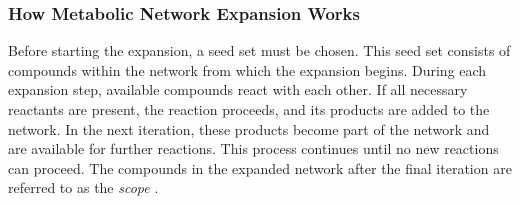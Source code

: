 \subsubsection*{How Metabolic Network Expansion Works}

Before starting the expansion, a seed set must be chosen. This seed set consists of compounds within the network from which the expansion begins. During each expansion step, available compounds react with each other. If all necessary reactants are present, the reaction proceeds, and its products are added to the network. In the next iteration, these products become part of the network and are available for further reactions. This process continues until no new reactions can proceed. The compounds in the expanded network after the final iteration are referred to as the \textit{scope} \cite{ebenhoh2004, handorf2005}.